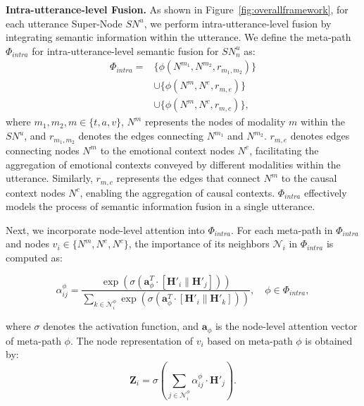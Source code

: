 \documentclass[11pt]{article}
\begin{document}
\noindent\textbf{Intra-utterance-level Fusion.} As shown in Figure~\ref{fig:overallframework}, for each utterance Super-Node $SN^u$, we perform intra-utterance-level fusion by integrating semantic information within the utterance.
We define the meta-path $\Phi_{intra}$ for  intra-utterance-level semantic fusion for $SN_n^u$ as:
\begin{equation}
\begin{aligned}
\Phi_{intra} = &\{\phi\left(N^{m_1}, N^{m_2}, r_{m_1,m_2}\right)\}\\
&\cup \{\phi\left(N^m, N^e, r_{m,e}\right)\} \\
&\cup \{\phi\left(N^m, N^c, r_{m,c}\right)\},
\end{aligned}
\end{equation}
where $m_1, m_2, m \in \{t, a, v\}$, $N^m$ represents the nodes of modality $m$ within the $SN^u$, and $r_{m_1,m_2}$ denotes the edges connecting $N^{m_1}$ and $N^{m_2}$. 
$r_{m,e}$ denotes edges connecting nodes $N^m$ to the emotional context nodes $N^e$, facilitating the aggregation of emotional contexts conveyed by different modalities within the utterance.
Similarly, $r_{m,c}$ represents the edges that connect $N^m$ to the causal context nodes $N^c$, enabling the aggregation of causal contexts.
$\Phi_{intra}$ effectively models the process of semantic information fusion in a single utterance.

Next, we incorporate node-level attention into $\Phi_{intra}$.
For each meta-path in $\Phi_{intra}$ and nodes $v_i\in \{N^m,N^e,N^c\}$, the importance of its neighbors $\mathcal{N}_i$ in $\Phi_{intra}$ is computed as:

\begin{small}
\begin{equation}
\alpha_{ij}^{\phi} = \frac{\exp\left(\sigma\left(\bm{a}_\phi^T \cdot \left[\bm{H}'_i \parallel \bm{H}'_j\right]\right)\right)}{\sum_{k \in \mathcal{N}_i^{\phi}} \exp\left(\sigma\left(\bm{a}_\phi^T \cdot \left[\bm{H}'_i \parallel \bm{H}'_k\right]\right)\right)}, \quad \phi \in \Phi_{intra},
\label{eq:11}
\end{equation}
\end{small}
where $\sigma$ denotes the activation function, and $\bm{a}_\phi$ is the node-level attention vector of meta-path $\phi$.
The node representation of $v_i$ based on meta-path $\phi$ is obtained by:
\begin{equation}
\bm{Z}_i = \sigma( \sum_{j \in \mathcal{N}_i^{\phi}} \alpha_{ij}^{\phi} \cdot \bm{H}'_j ).
\label{eq:12}
\end{equation}
\end{document}
